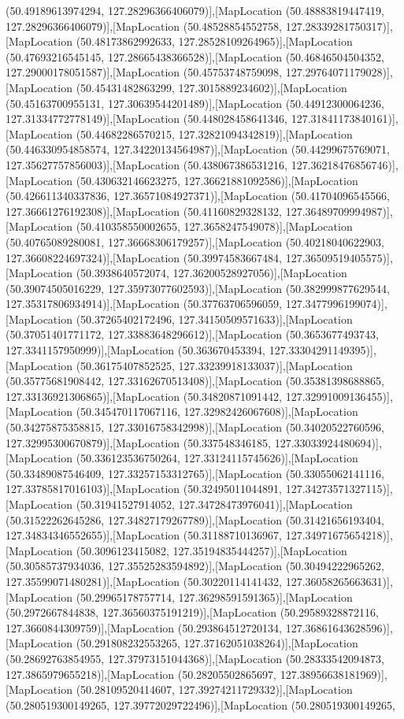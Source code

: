 (50.49189613974294, 127.28296366406079)],[MapLocation (50.48883819447419, 127.28296366406079)],[MapLocation (50.48528854552758, 127.28339281750317)],[MapLocation (50.48173862992633, 127.28528109264965)],[MapLocation (50.47693216545145, 127.28665438366528)],[MapLocation (50.46846504504352, 127.29000178051587)],[MapLocation (50.45753748759098, 127.29764071179028)],[MapLocation (50.45431482863299, 127.3015889234602)],[MapLocation (50.45163700955131, 127.30639544201489)],[MapLocation (50.44912300064236, 127.31334772778149)],[MapLocation (50.448028458641346, 127.31841173840161)],[MapLocation (50.44682286570215, 127.32821094342819)],[MapLocation (50.446330954858574, 127.34220134564987)],[MapLocation (50.44299675769071, 127.35627757856003)],[MapLocation (50.438067386531216, 127.36218476856746)],[MapLocation (50.430632146623275, 127.36621881092586)],[MapLocation (50.426611340337836, 127.36571084927371)],[MapLocation (50.41704096545566, 127.36661276192308)],[MapLocation (50.41160829328132, 127.36489709994987)],[MapLocation (50.410358550002655, 127.3658247549078)],[MapLocation (50.40765089280081, 127.36668306179257)],[MapLocation (50.40218040622903, 127.36608224697324)],[MapLocation (50.39974583667484, 127.36509519405575)],[MapLocation (50.3938640572074, 127.36200528927056)],[MapLocation (50.39074505016229, 127.35973077602593)],[MapLocation (50.382999877629544, 127.35317806934914)],[MapLocation (50.37763706596059, 127.3477996199074)],[MapLocation (50.37265402172496, 127.34150509571633)],[MapLocation (50.37051401771172, 127.33883648296612)],[MapLocation (50.3653677493743, 127.3341157950999)],[MapLocation (50.363670453394, 127.33304291149395)],[MapLocation (50.36175407852525, 127.33239918133037)],[MapLocation (50.35775681908442, 127.33162670513408)],[MapLocation (50.35381398688865, 127.33136921306865)],[MapLocation (50.34820871091442, 127.32991009136455)],[MapLocation (50.345470117067116, 127.32982426067608)],[MapLocation (50.34275875358815, 127.33016758342998)],[MapLocation (50.34020522760596, 127.32995300670879)],[MapLocation (50.337548346185, 127.33033924480694)],[MapLocation (50.336123536750264, 127.33124115745626)],[MapLocation (50.33489087546409, 127.33257153312765)],[MapLocation (50.33055062141116, 127.33785817016103)],[MapLocation (50.32495011044891, 127.34273571327115)],[MapLocation (50.31941527914052, 127.34728473976041)],[MapLocation (50.31522262645286, 127.34827179267789)],[MapLocation (50.31421656193404, 127.34834346552655)],[MapLocation (50.31188710136967, 127.34971675654218)],[MapLocation (50.3096123415082, 127.35194835444257)],[MapLocation (50.30585737934036, 127.35525283594892)],[MapLocation (50.30494222965262, 127.35599071480281)],[MapLocation (50.30220114141432, 127.36058265663631)],[MapLocation (50.29965178757714, 127.36298591591365)],[MapLocation (50.2972667844838, 127.36560375191219)],[MapLocation (50.29589328872116, 127.3660844309759)],[MapLocation (50.293864512720134, 127.36861643628596)],[MapLocation (50.291808232553265, 127.37162051038264)],[MapLocation (50.28692763854955, 127.37973151044368)],[MapLocation (50.28333542094873, 127.3865979655218)],[MapLocation (50.28205502865697, 127.38956638181969)],[MapLocation (50.28109520414607, 127.39274211729332)],[MapLocation (50.280519300149265, 127.39772029722496)],[MapLocation (50.280519300149265, 